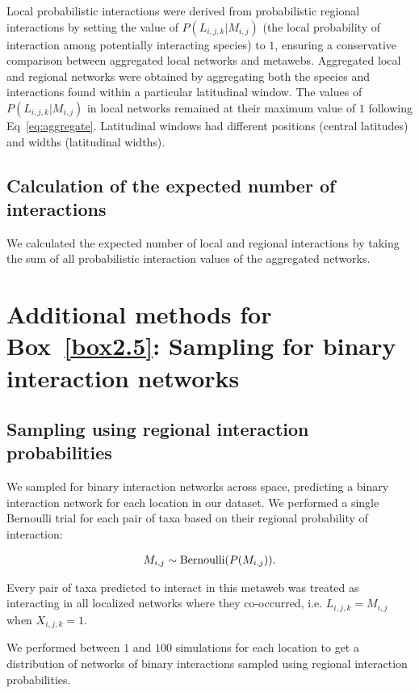 \begin{refsection}
Local probabilistic interactions were derived from probabilistic regional
interactions by setting the value of $P(L_{i, j, k}|M_{i,j})$ (the local
probability of interaction among potentially interacting species) to $1$,
ensuring a conservative comparison between aggregated local networks and
metawebs. Aggregated local and regional networks were obtained by aggregating
both the species and interactions found within a particular latitudinal window.
The values of $P(L_{i, j, k}|M_{i, j})$ in local networks remained at their
maximum value of $1$ following Eq~\ref{eq:aggregate}. Latitudinal windows had
different positions (central latitudes) and widths (latitudinal widths).

\subsection{Calculation of the expected number of interactions}

We calculated the expected number of local and regional interactions by taking
the sum of all probabilistic interaction values of the aggregated networks. 

\section{Additional methods for Box~\ref{box2.5}: Sampling for binary interaction networks}

\subsection{Sampling using regional interaction probabilities}

We sampled for binary interaction networks across space, predicting a binary
interaction network for each location in our dataset. We performed a single
Bernoulli trial for each pair of taxa based on their regional probability of
interaction: 

\begin{eqnarray}
    \label{eq:sample1_sup}
    M_{i, j} \sim {\rm Bernoulli}(P(M_{i, j})).
\end{eqnarray}

Every pair of taxa predicted to interact in this metaweb was treated as
interacting in all localized networks where they co-occurred, i.e. $L_{i, j, k}
= M_{i, j}$ when $X_{i,j,k} = 1$.

We performed between $1$ and $100$ simulations for each location to get a
distribution of networks of binary interactions sampled using regional
interaction probabilities.


\end{refsection}
